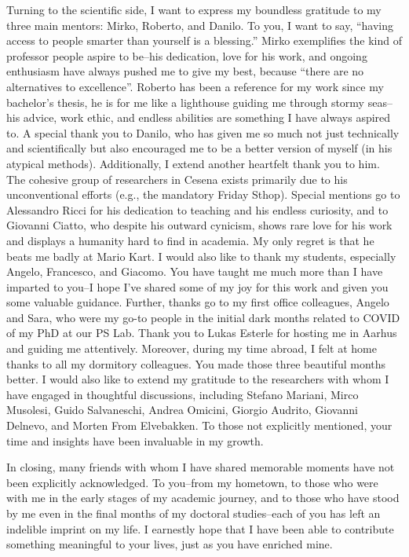 Turning to the scientific side, 
 I want to express my boundless gratitude to my three main mentors: Mirko, Roberto, and Danilo. 
 To you, I want to say, ``having access to people smarter than yourself is a blessing.'' 
% 
Mirko exemplifies the kind of professor people aspire to be--his dedication, love for his work, 
 and ongoing enthusiasm have always pushed me to give my best, because ``there are no alternatives to excellence''. 
 Roberto has been a reference for my work since my bachelor's thesis, 
 he is for me like a lighthouse guiding me through stormy seas--his advice, work ethic, and endless abilities are something I have always aspired to. 
 A special thank you to Danilo, 
 who has given me so much not just technically and scientifically 
 but also encouraged me to be a better version of myself (in his atypical methods).
 Additionally, I extend another heartfelt thank you to him. The cohesive group of researchers in Cesena exists primarily due to his unconventional efforts (e.g., the mandatory Friday Sthop).
%
Special mentions go to Alessandro Ricci for his dedication to teaching and his endless curiosity, 
 and to Giovanni Ciatto, who despite his outward cynicism, shows rare love for his work and displays a humanity hard to find in academia. 
 My only regret is that he beats me badly at Mario Kart.
%
I would also like to thank my students, especially Angelo, Francesco, and Giacomo. 
 You have taught me much more than I have imparted to you--I hope I've shared some of my joy for this work and given you some valuable guidance.
%
Further, thanks go to my first office colleagues, Angelo and Sara, who were my go-to people in the initial dark months related to COVID of my PhD at our PS Lab.
%
Thank you to Lukas Esterle for hosting me in Aarhus and guiding me attentively. 
Moreover, during my time abroad, I felt at home thanks to all my dormitory colleagues. 
You made those three beautiful months better.
%
I would also like to extend my gratitude to the researchers with whom I have engaged in thoughtful discussions, including Stefano Mariani, Mirco Musolesi, Guido Salvaneschi, Andrea Omicini, Giorgio Audrito, Giovanni Delnevo, and Morten From Elvebakken. To those not explicitly mentioned, your time and insights have been invaluable in my growth.

In closing, 
 many friends with whom I have shared memorable moments have not been explicitly acknowledged. 
 To you--from my hometown, to those who were with me in the early stages of my academic journey, and to those who have stood by me even in the final months of my doctoral studies--each of you has left an indelible imprint on my life. 
 I earnestly hope that I have been able to contribute something meaningful to your lives, just as you have enriched mine.